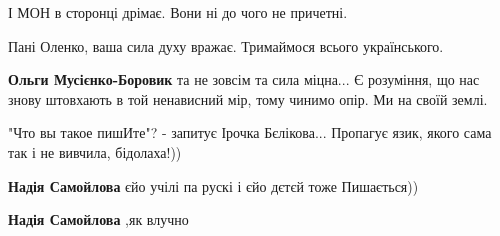 \begin{itemize}
\begin{itemize}
І МОН в сторонці дрімає. Вони ні до чого не причетні.
\end{itemize}

 
Пані Оленко, ваша сила духу вражає. Тримаймося всього українського.

\begin{itemize}
 
\textbf{Ольги Мусієнко-Боровик} та не зовсім та сила міцна...
Є розуміння, що нас знову штовхають в той ненависний мір, тому чинимо опір. Ми на своїй землі.
\end{itemize}

 
"Что вы такое пишИте"? - запитує Ірочка Бєлікова... Пропагує язик, якого сама
так і не вивчила, бідолаха!))

\begin{itemize}
 
\textbf{Надія Самойлова} єйо учілі па рускі і єйо дєтєй тоже
Пишається))

 
\textbf{Надія Самойлова} ,як влучно

 

\end{itemize}
\end{itemize}
